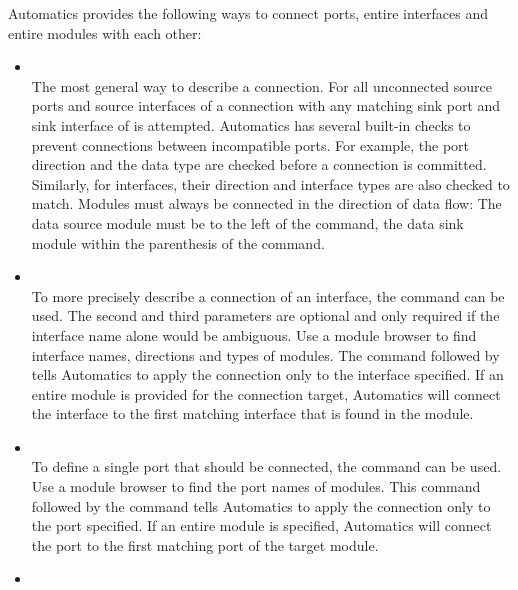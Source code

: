 Automatics provides the following ways to connect ports, entire interfaces and entire modules with each other:\\
\begin{itemize}
\item {}\\
The most general way to describe a connection.
For all unconnected source ports and source interfaces of  a connection with any matching sink port and sink interface of  is attempted.
Automatics has several built-in checks to prevent connections between incompatible ports.
For example, the port direction and the data type are checked before a connection is committed.
Similarly, for interfaces, their direction and interface types are also checked to match.
Modules must always be connected in the direction of data flow:
The data source module must be to the left of the  command, the data sink module within the parenthesis of the  command.
\item {}\\
To more precisely describe a connection of an interface, the command  can be used.
The second and third parameters are optional and only required if the interface name alone would be ambiguous.
Use a module browser to find interface names, directions and types of modules.
The  command followed by  tells Automatics to apply the connection only to the interface specified.
If an entire module is provided for the connection target, Automatics will connect the interface to the first matching interface that is found in the module.
\item {}\\
To define a single port that should be connected, the  command can be used.
Use a module browser to find the port names of modules.
This command followed by the  command tells Automatics to apply the connection only to the port specified.
If an entire module is specified, Automatics will connect the port to the first matching port of the target module.
\item {}\\

\end{itemize}
